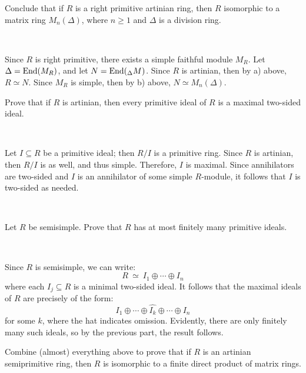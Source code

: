 \begin{exr}
	Conclude that if $R$ is a right primitive artinian ring,
	then $R$ isomorphic to a matrix ring $M_n(\Delta)$,
	where $n\geq 1$ and $\Delta$ is a division ring.
\end{exr} \

\begin{pf}
	Since $R$ is right primitive, there exists a simple faithful module $M_{R}$.
	Let $\Delta=\operatorname{End}(M_{R})$, and let $N=\operatorname{End}(_{\Delta}M)$.
	Since $R$ is artinian, then by a) above, $R\simeq N$.
	Since $M_{R}$ is simple, then by b) above, $N\simeq M_{n}(\Delta)$.
\end{pf}


\nq
\begin{exr}
	Prove that if $R$ is artinian, then every primitive ideal of $R$ is a
	maximal two-sided ideal.
\end{exr} \

\begin{pf}
	Let $I\subseteq R$ be a primitive ideal; then $R/I$ is a primitive ring.
	Since $R$ is artinian, then $R/I$ is as well, and thus simple.
	Therefore, $I$ is maximal.
	Since annihilators are two-sided and $I$ is an annihilator of some simple $R$-module,
	it follows that $I$ is two-sided as needed.
\end{pf} \

\begin{exr}
	Let $R$ be semisimple. Prove that $R$ has at most finitely many
	primitive ideals.
\end{exr} \

\begin{pf}
	Since $R$ is semisimple, we can write:
	\begin{equation*}
		R \ \simeq \ I_{1} \oplus \cdots \oplus I_{n}
	\end{equation*}
	where each $I_{j}\subseteq R$ is a minimal two-sided ideal.
	It follows that the maximal ideals of $R$ are precisely of the form:
	\begin{equation*}
		I_{1} \oplus \cdots \oplus \hat{I_{k}} \oplus \cdots \oplus I_{n}
	\end{equation*}
	for some $k$, where the hat indicates omission.
	Evidently, there are only finitely many such ideals,
	so by the previous part, the result follows.
\end{pf}

\newpage
{}
\begin{exr}[title=Artin-Wedderburn Theorem]
	Combine (almost) everything above to prove that if $R$ is
	an artinian semiprimitive ring, then $R$ is isomorphic to
	a finite direct product of matrix rings.
\end{exr} \

